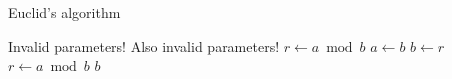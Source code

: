 \documentclass{article}
\begin{document}
    \begin{algorithm}
        \caption{Euclid’s algorithm}
        \label{euclid}
        \begin{algorithmic}[1] %
             
                    \State \Return Invalid parameters!
                    \State \Return Also invalid parameters!
                \Else
                    \State $r\gets a \bmod b$
                     
                        \State $a \gets b$
                        \State $b \gets r$
                        \State $r \gets a \bmod b$
                    \EndWhile\label{euclidendwhile}
                    \State \Return $b$
                \EndIf
            \EndProcedure
        \end{algorithmic}
    \end{algorithm}
\end{document}

